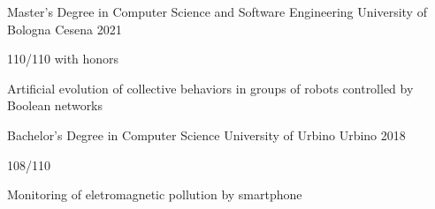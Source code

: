 



\begin{cventries}


\cventry
{Master's Degree in Computer Science and Software Engineering} %
{University of Bologna} %
{Cesena} %
{2021} %
{ %
\begin{cvitems}
\item {110/110 with honors}
\item {Artificial evolution of collective behaviors in groups of robots controlled by Boolean networks}
\end{cvitems}
}

\cventry
{Bachelor's Degree in Computer Science} %
{University of Urbino} %
{Urbino} %
{2018} %
{ %
\begin{cvitems}
\item {108/110}
\item {Monitoring of eletromagnetic pollution by smartphone}
\end{cvitems}
}


\end{cventries}